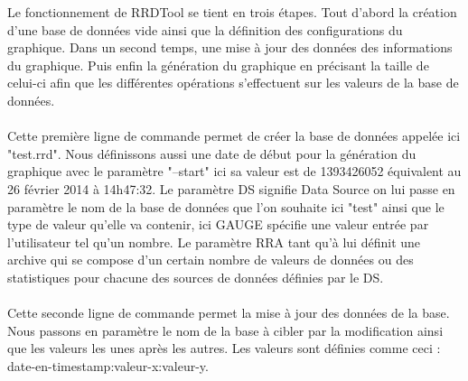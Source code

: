 Le fonctionnement de RRDTool se tient en trois étapes. Tout d'abord la création d'une base de données vide ainsi que la définition des configurations du graphique. Dans un second temps, une mise à jour des données des informations du graphique. Puis enfin la génération du graphique en précisant la taille de celui-ci afin que les différentes opérations s'effectuent sur les valeurs de la base de données.\\

\\

Cette première ligne de commande permet de créer la base de données appelée ici "test.rrd". Nous définissons aussi une date de début pour la génération du graphique avec le paramètre "--start" ici sa valeur est de 1393426052 équivalent au 26 février 2014 à 14h47:32. Le paramètre DS signifie Data Source on lui passe en paramètre le nom de la base de données que l'on souhaite ici "test" ainsi que le type de valeur qu'elle va contenir, ici GAUGE spécifie une valeur entrée par l'utilisateur tel qu'un nombre. Le paramètre RRA tant qu'à lui définit une archive qui se compose d'un certain nombre de valeurs de données ou des statistiques pour chacune des sources de données définies par le DS.\\


\\

Cette seconde ligne de commande permet la mise à jour des données de la base. Nous passons en paramètre le nom de la base à cibler par la modification ainsi que les valeurs les unes après les autres. Les valeurs sont définies comme ceci : date-en-timestamp:valeur-x:valeur-y. \\

\\

